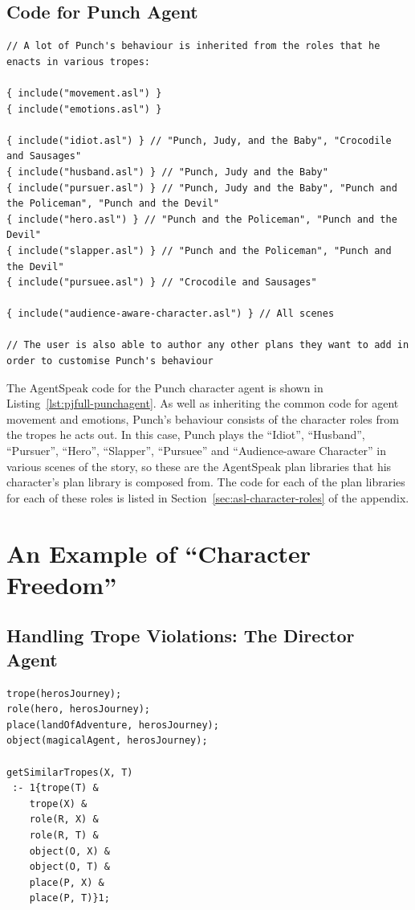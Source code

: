 \documentclass[11pt]{report}
\begin{document}
\subsection{Code for Punch Agent}
\begin{lstlisting}[showstringspaces=false,
label=lst:pjfull-punchagent,caption={AgentSpeak code for the Punch agent}]
// A lot of Punch's behaviour is inherited from the roles that he enacts in various tropes:

{ include("movement.asl") }
{ include("emotions.asl") }

{ include("idiot.asl") } // "Punch, Judy, and the Baby", "Crocodile and Sausages"
{ include("husband.asl") } // "Punch, Judy and the Baby"
{ include("pursuer.asl") } // "Punch, Judy and the Baby", "Punch and the Policeman", "Punch and the Devil"
{ include("hero.asl") } // "Punch and the Policeman", "Punch and the Devil"
{ include("slapper.asl") } // "Punch and the Policeman", "Punch and the Devil"
{ include("pursuee.asl") } // "Crocodile and Sausages"

{ include("audience-aware-character.asl") } // All scenes

// The user is also able to author any other plans they want to add in order to customise Punch's behaviour
\end{lstlisting}

The AgentSpeak code for the Punch character agent is shown in
Listing~\ref{lst:pjfull-punchagent}. As well as inheriting the common code for
agent movement and emotions, Punch's behaviour consists of the character roles
from the tropes he acts out. In this case, Punch plays the ``Idiot'',
``Husband'', ``Pursuer'', ``Hero'', ``Slapper'', ``Pursuee'' and
``Audience-aware Character'' in various scenes of the story, so these are the
AgentSpeak plan libraries that his character's plan library is composed from.
The code for each of the plan libraries for each of these roles is listed in
Section~\ref{sec:asl-character-roles} of the appendix.

\section{An Example of ``Character Freedom''}
\label{sec:freedom-example}

\subsection{Handling Trope Violations: The Director Agent}
\begin{lstlisting}[showstringspaces=false,
label=lst:pjfull-heroagent,caption={AgentSpeak code for the ``Director'' agent}]
trope(herosJourney);
role(hero, herosJourney);
place(landOfAdventure, herosJourney);
object(magicalAgent, herosJourney);

getSimilarTropes(X, T)
 :- 1{trope(T) &
    trope(X) &
    role(R, X) &
    role(R, T) &
    object(O, X) &
    object(O, T) &
    place(P, X) &
    place(P, T)}1;

\end{lstlisting}
\end{document}
